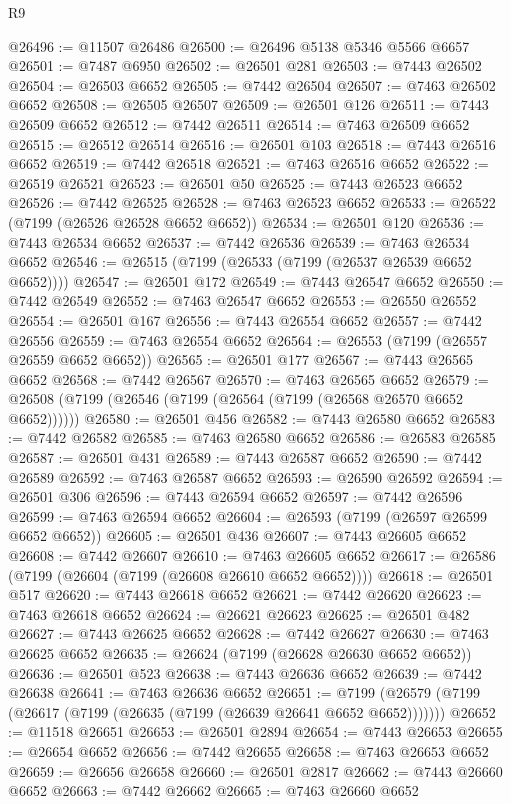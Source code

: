 \begin{lexlean}{R9}
\begin{coremodule}
@26496 := @11507 @26486
@26500 := @26496 @5138 @5346 @5566 @6657
@26501 := @7487 @6950
@26502 := @26501 @281
@26503 := @7443 @26502
@26504 := @26503 @6652
@26505 := @7442 @26504
@26507 := @7463 @26502 @6652
@26508 := @26505 @26507
@26509 := @26501 @126
@26511 := @7443 @26509 @6652
@26512 := @7442 @26511
@26514 := @7463 @26509 @6652
@26515 := @26512 @26514
@26516 := @26501 @103
@26518 := @7443 @26516 @6652
@26519 := @7442 @26518
@26521 := @7463 @26516 @6652
@26522 := @26519 @26521
@26523 := @26501 @50
@26525 := @7443 @26523 @6652
@26526 := @7442 @26525
@26528 := @7463 @26523 @6652
@26533 := @26522 (@7199 (@26526 @26528 @6652 @6652))
@26534 := @26501 @120
@26536 := @7443 @26534 @6652
@26537 := @7442 @26536
@26539 := @7463 @26534 @6652
@26546 := @26515 (@7199 (@26533 (@7199 (@26537 @26539 @6652 @6652))))
@26547 := @26501 @172
@26549 := @7443 @26547 @6652
@26550 := @7442 @26549
@26552 := @7463 @26547 @6652
@26553 := @26550 @26552
@26554 := @26501 @167
@26556 := @7443 @26554 @6652
@26557 := @7442 @26556
@26559 := @7463 @26554 @6652
@26564 := @26553 (@7199 (@26557 @26559 @6652 @6652))
@26565 := @26501 @177
@26567 := @7443 @26565 @6652
@26568 := @7442 @26567
@26570 := @7463 @26565 @6652
@26579 := @26508 (@7199 (@26546 (@7199 (@26564 (@7199 (@26568 @26570 @6652 @6652))))))
@26580 := @26501 @456
@26582 := @7443 @26580 @6652
@26583 := @7442 @26582
@26585 := @7463 @26580 @6652
@26586 := @26583 @26585
@26587 := @26501 @431
@26589 := @7443 @26587 @6652
@26590 := @7442 @26589
@26592 := @7463 @26587 @6652
@26593 := @26590 @26592
@26594 := @26501 @306
@26596 := @7443 @26594 @6652
@26597 := @7442 @26596
@26599 := @7463 @26594 @6652
@26604 := @26593 (@7199 (@26597 @26599 @6652 @6652))
@26605 := @26501 @436
@26607 := @7443 @26605 @6652
@26608 := @7442 @26607
@26610 := @7463 @26605 @6652
@26617 := @26586 (@7199 (@26604 (@7199 (@26608 @26610 @6652 @6652))))
@26618 := @26501 @517
@26620 := @7443 @26618 @6652
@26621 := @7442 @26620
@26623 := @7463 @26618 @6652
@26624 := @26621 @26623
@26625 := @26501 @482
@26627 := @7443 @26625 @6652
@26628 := @7442 @26627
@26630 := @7463 @26625 @6652
@26635 := @26624 (@7199 (@26628 @26630 @6652 @6652))
@26636 := @26501 @523
@26638 := @7443 @26636 @6652
@26639 := @7442 @26638
@26641 := @7463 @26636 @6652
@26651 := @7199 (@26579 (@7199 (@26617 (@7199 (@26635 (@7199 (@26639 @26641 @6652 @6652)))))))
@26652 := @11518 @26651
@26653 := @26501 @2894
@26654 := @7443 @26653
@26655 := @26654 @6652
@26656 := @7442 @26655
@26658 := @7463 @26653 @6652
@26659 := @26656 @26658
@26660 := @26501 @2817
@26662 := @7443 @26660 @6652
@26663 := @7442 @26662
@26665 := @7463 @26660 @6652

\end{coremodule}
\end{lexlean}
